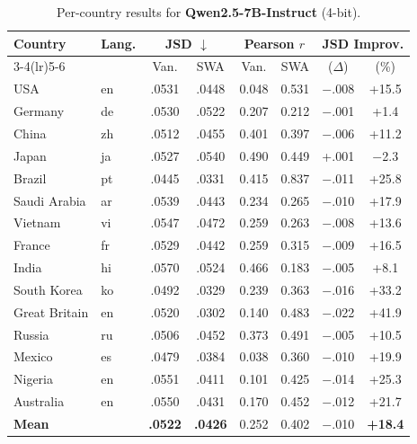 \documentclass{article}
\newcommand{\gain}[1]{\textcolor{improvegreen}{#1}}
\newcommand{\loss}[1]{\textcolor{worsered}{#1}}
\begin{document}
\begin{table}[h]
\caption{Per-country results for \textbf{Qwen2.5-7B-Instruct} (4-bit).}
\label{tab:qwen7b_percountry}
\centering\setlength{\tabcolsep}{3.5pt}\footnotesize
\begin{tabular}{llcccccc}
\toprule
Country & Lang. & \multicolumn{2}{c}{JSD $\downarrow$} & \multicolumn{2}{c}{Pearson $r$} & \multicolumn{2}{c}{JSD Improv.} \\
\cmidrule(lr){3-4}\cmidrule(lr){5-6}
 & & Van. & SWA & Van. & SWA & ($\Delta$) & (\%) \\
\midrule
USA         & en & .0531 & .0448 & 0.048 & 0.531 & $-$.008 & \gain{+15.5} \\
Germany     & de & .0530 & .0522 & 0.207 & 0.212 & $-$.001 & \gain{+1.4} \\
China       & zh & .0512 & .0455 & 0.401 & 0.397 & $-$.006 & \gain{+11.2} \\
Japan       & ja & .0527 & .0540 & 0.490 & 0.449 & +.001 & \loss{$-$2.3} \\
Brazil      & pt & .0445 & .0331 & 0.415 & 0.837 & $-$.011 & \gain{+25.8} \\
Saudi Arabia& ar & .0539 & .0443 & 0.234 & 0.265 & $-$.010 & \gain{+17.9} \\
Vietnam     & vi & .0547 & .0472 & 0.259 & 0.263 & $-$.008 & \gain{+13.6} \\
France      & fr & .0529 & .0442 & 0.259 & 0.315 & $-$.009 & \gain{+16.5} \\
India       & hi & .0570 & .0524 & 0.466 & 0.183 & $-$.005 & \gain{+8.1} \\
South Korea & ko & .0492 & .0329 & 0.239 & 0.363 & $-$.016 & \gain{+33.2} \\
Great Britain& en& .0520 & .0302 & 0.140 & 0.483 & $-$.022 & \gain{+41.9} \\
Russia      & ru & .0506 & .0452 & 0.373 & 0.491 & $-$.005 & \gain{+10.5} \\
Mexico      & es & .0479 & .0384 & 0.038 & 0.360 & $-$.010 & \gain{+19.9} \\
Nigeria     & en & .0551 & .0411 & 0.101 & 0.425 & $-$.014 & \gain{+25.3} \\
Australia   & en & .0550 & .0431 & 0.170 & 0.452 & $-$.012 & \gain{+21.7} \\
\midrule
\textbf{Mean} & & \textbf{.0522} & \textbf{.0426} & 0.252 & 0.402 & $-$.010 & \gain{\textbf{+18.4}} \\
\bottomrule
\end{tabular}
\end{table}
\end{document}
